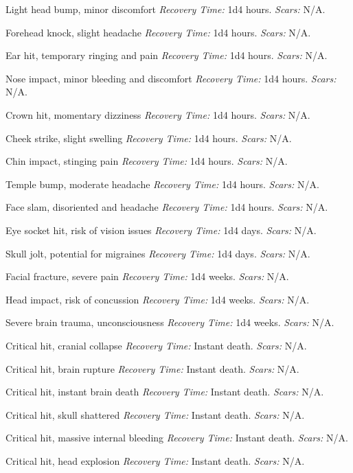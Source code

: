 \documentclass[12pt]{book}  %
\begin{document}
\begin{description}[labelwidth=1.5em, leftmargin=*, itemsep=0.4em]
    \item[1 -] Light head bump, minor discomfort \textit{Recovery Time:} 1d4 hours. \textit{Scars:} N/A.
    \item[2 -] Forehead knock, slight headache \textit{Recovery Time:} 1d4 hours. \textit{Scars:} N/A.
    \item[3 -] Ear hit, temporary ringing and pain \textit{Recovery Time:} 1d4 hours. \textit{Scars:} N/A.
    \item[4 -] Nose impact, minor bleeding and discomfort \textit{Recovery Time:} 1d4 hours. \textit{Scars:} N/A.
    \item[5 -] Crown hit, momentary dizziness \textit{Recovery Time:} 1d4 hours. \textit{Scars:} N/A.
    \item[6 -] Cheek strike, slight swelling \textit{Recovery Time:} 1d4 hours. \textit{Scars:} N/A.
    \item[7 -] Chin impact, stinging pain \textit{Recovery Time:} 1d4 hours. \textit{Scars:} N/A.
    \item[8 -] Temple bump, moderate headache \textit{Recovery Time:} 1d4 hours. \textit{Scars:} N/A.
    \item[9 -] Face slam, disoriented and headache \textit{Recovery Time:} 1d4 hours. \textit{Scars:} N/A.
    \item[10 -] Eye socket hit, risk of vision issues \textit{Recovery Time:} 1d4 days. \textit{Scars:} N/A.
    \item[11 -] Skull jolt, potential for migraines \textit{Recovery Time:} 1d4 days. \textit{Scars:} N/A.
    \item[12 -] Facial fracture, severe pain \textit{Recovery Time:} 1d4 weeks. \textit{Scars:} N/A.
    \item[13 -] Head impact, risk of concussion \textit{Recovery Time:} 1d4 weeks. \textit{Scars:} N/A.
    \item[14 -] Severe brain trauma, unconsciousness \textit{Recovery Time:} 1d4 weeks. \textit{Scars:} N/A.
    \item[15 -] Critical hit, cranial collapse \textit{Recovery Time:} Instant death. \textit{Scars:} N/A.
    \item[16 -] Critical hit, brain rupture \textit{Recovery Time:} Instant death. \textit{Scars:} N/A.
    \item[17 -] Critical hit, instant brain death \textit{Recovery Time:} Instant death. \textit{Scars:} N/A.
    \item[18 -] Critical hit, skull shattered \textit{Recovery Time:} Instant death. \textit{Scars:} N/A.
    \item[19 -] Critical hit, massive internal bleeding \textit{Recovery Time:} Instant death. \textit{Scars:} N/A.
    \item[20 -] Critical hit, head explosion \textit{Recovery Time:} Instant death. \textit{Scars:} N/A.
\end{description}
\end{document}
